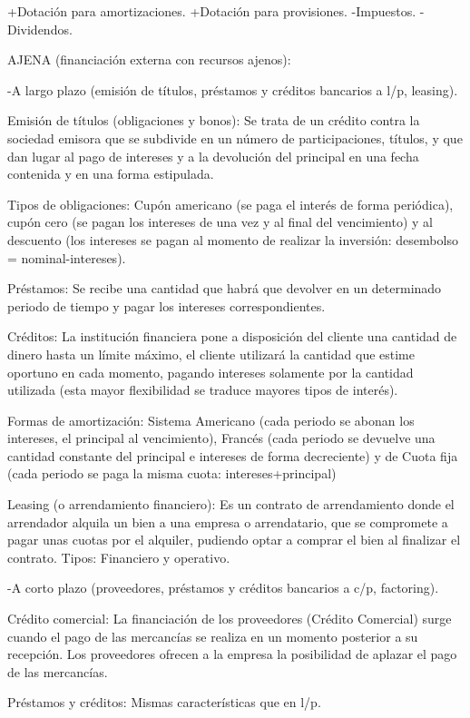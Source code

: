 \documentclass[12pt, twoside, openright]{report} %
\begin{document}
+Dotación para amortizaciones. +Dotación para provisiones. -Impuestos. -Dividendos.

AJENA (financiación externa con recursos ajenos):

-A largo plazo (emisión de títulos, préstamos y créditos bancarios a l/p, leasing).

Emisión de títulos (obligaciones y bonos): Se trata de un crédito contra la sociedad emisora que se subdivide en un número de participaciones, títulos, y que dan lugar al pago de intereses y a la devolución del principal en una fecha contenida y en una forma estipulada.

Tipos de obligaciones: Cupón americano (se paga el interés de forma periódica), cupón cero (se pagan los intereses de una vez y al final del vencimiento) y al descuento (los intereses se pagan al momento de realizar la inversión: desembolso = nominal-intereses).

Préstamos: Se recibe una cantidad que habrá que devolver en un determinado periodo de tiempo y pagar los intereses correspondientes.

Créditos: La institución financiera pone a disposición del cliente una cantidad de dinero hasta un límite máximo, el cliente utilizará la cantidad que estime oportuno en cada momento, pagando intereses solamente por la cantidad utilizada (esta mayor flexibilidad se traduce mayores tipos de interés).

Formas de amortización: Sistema Americano (cada periodo se abonan los intereses, el principal al vencimiento), Francés (cada periodo se devuelve una cantidad constante del principal e intereses de forma decreciente) y de Cuota fija (cada periodo se paga la misma cuota: intereses+principal)

Leasing (o arrendamiento financiero): Es un contrato de arrendamiento donde el arrendador alquila un bien a una empresa o arrendatario, que se compromete a pagar unas cuotas por el alquiler, pudiendo optar a comprar el bien al finalizar el contrato. Tipos: Financiero y operativo.

-A corto plazo (proveedores, préstamos y créditos bancarios a c/p, factoring).

Crédito comercial: La financiación de los proveedores (Crédito Comercial) surge cuando el pago de las mercancías se realiza en un momento posterior a su recepción. Los proveedores ofrecen a la empresa la posibilidad de aplazar el pago de las mercancías.

Préstamos y créditos: Mismas características que en l/p.
\end{document}

